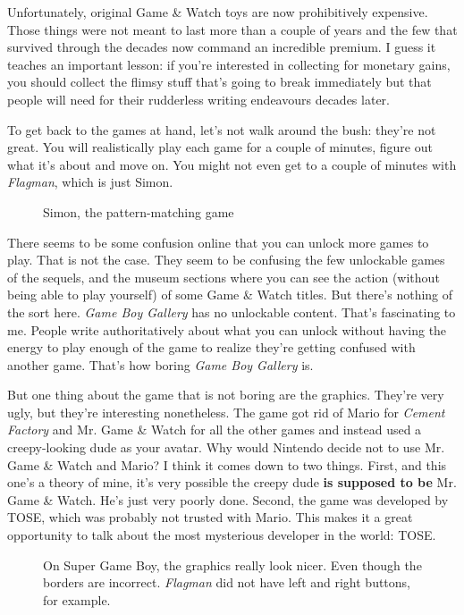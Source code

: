 \documentclass{book}
\begin{document}
Unfortunately, original Game \& Watch toys are now prohibitively expensive. Those things were not meant to last more than a couple of years and the few that survived through the decades now command an incredible premium. I guess it teaches an important lesson: if you’re interested in collecting for monetary gains, you should collect the flimsy stuff that’s going to break immediately but that people will need for their rudderless writing endeavours decades later.\par
To get back to the games at hand, let’s not walk around the bush: they’re not great. You will realistically play each game for a couple of minutes, figure out what it’s about and move on. You might not even get to a couple of minutes with \emph{Flagman}, which is just Simon.\par
\FloatBarrier\vspace{\baselineskip}\begin{figure}[H]\caption*{Simon, the pattern-matching game}\end{figure}
There seems to be some confusion online that you can unlock more games to play. That is not the case. They seem to be confusing the few unlockable games of the sequels, and the museum sections where you can see the action (without being able to play yourself) of some Game \& Watch titles. But there’s nothing of the sort here. \emph{Game Boy Gallery} has no unlockable content. That’s fascinating to me. People write authoritatively about what you can unlock without having the energy to play enough of the game to realize they’re getting confused with another game. That’s how boring \emph{Game Boy Gallery} is.\par
But one thing about the game that is not boring are the graphics. They’re very ugly, but they’re interesting nonetheless. The game got rid of Mario for \emph{Cement Factory} and Mr. Game \& Watch for all the other games and instead used a creepy-looking dude as your avatar. Why would Nintendo decide not to use Mr. Game \& Watch and Mario? I think it comes down to two things. First, and this one’s a theory of mine, it’s very possible the creepy dude \textbf{is supposed to be} Mr. Game \& Watch. He’s just very poorly done. Second, the game was developed by TOSE, which was probably not trusted with Mario. This makes it a great opportunity to talk about the most mysterious developer in the world: TOSE.\par
\FloatBarrier\vspace{\baselineskip}\begin{figure}[H]\caption*{On Super Game Boy, the graphics really look nicer. Even though the borders are incorrect. \emph{Flagman} did not have left and right buttons, for example.}\end{figure}
\end{document}
